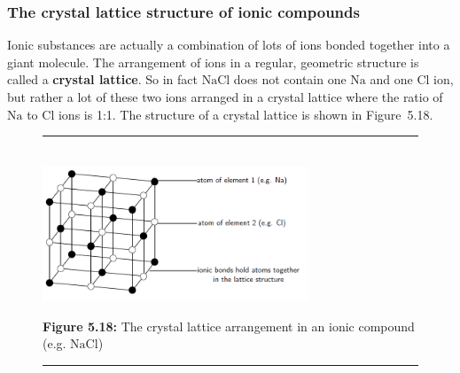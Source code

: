             \subsubsection{ The crystal lattice structure of ionic compounds}
            \nopagebreak
        \label{m38684*id142771}Ionic substances are actually a combination of lots of ions bonded
together into a giant molecule. The arrangement of ions in a regular,
geometric structure is called a \textbf{crystal lattice}. So in
fact $\mathrm{NaCl}$ does not contain one $\mathrm{Na}$ and one $\mathrm{Cl}$ ion, but rather a lot of
these two ions arranged in a crystal lattice where the ratio of $\mathrm{Na}$ to
$\mathrm{Cl}$ ions is 1:1. The structure of a crystal lattice is shown in Figure~5.18.\par 
    \setcounter{subfigure}{0}
	\begin{figure}[H] %
    \begin{center}
    \rule[.1in]{\figurerulewidth}{.005in} \\
        \label{m38684*uid70!!!underscore!!!media}\label{m38684*uid70!!!underscore!!!printimage}\includegraphics[width=300px]{col11305.imgs/m38684_CG11C1_021.png} %
      \vspace{2pt}
    \vspace{\rubberspace}\par \begin{cnxcaption}
	  \small \textbf{Figure 5.18: }The crystal lattice arrangement in an ionic compound (e.g. $\mathrm{NaCl}$)
	\end{cnxcaption}
    \vspace{.1in}
    \rule[.1in]{\figurerulewidth}{.005in} \\
    \end{center}
 \end{figure}       
      \label{m38684*uid71}
